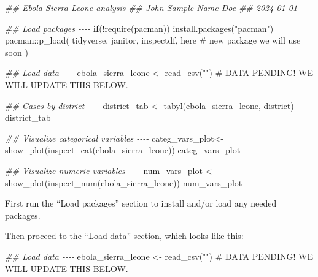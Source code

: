 \documentclass[
  letterpaper,
  DIV=11,
  numbers=noendperiod]{scrreprt}
\newenvironment{Shaded}{\begin{snugshade}}{\end{snugshade}}
\newcommand{\CommentTok}[1]{\textcolor[rgb]{0.37,0.37,0.37}{#1}}
\newcommand{\ControlFlowTok}[1]{\textcolor[rgb]{0.00,0.23,0.31}{\textbf{#1}}}
\newcommand{\DocumentationTok}[1]{\textcolor[rgb]{0.37,0.37,0.37}{\textit{#1}}}
\newcommand{\FunctionTok}[1]{\textcolor[rgb]{0.28,0.35,0.67}{#1}}
\newcommand{\NormalTok}[1]{\textcolor[rgb]{0.00,0.23,0.31}{#1}}
\newcommand{\OtherTok}[1]{\textcolor[rgb]{0.00,0.23,0.31}{#1}}
\newcommand{\SpecialCharTok}[1]{\textcolor[rgb]{0.37,0.37,0.37}{#1}}
\newcommand{\StringTok}[1]{\textcolor[rgb]{0.13,0.47,0.30}{#1}}
\begin{document}
\begin{Shaded}
\begin{Highlighting}[]
\DocumentationTok{\#\# Ebola Sierra Leone analysis}
\DocumentationTok{\#\# John Sample{-}Name Doe}
\DocumentationTok{\#\# 2024{-}01{-}01}


\DocumentationTok{\#\# Load packages {-}{-}{-}{-}}
\ControlFlowTok{if}\NormalTok{(}\SpecialCharTok{!}\FunctionTok{require}\NormalTok{(pacman)) }\FunctionTok{install.packages}\NormalTok{(}\StringTok{"pacman"}\NormalTok{)}
\NormalTok{pacman}\SpecialCharTok{::}\FunctionTok{p\_load}\NormalTok{(}
\NormalTok{  tidyverse,}
\NormalTok{  janitor,}
\NormalTok{  inspectdf,}
\NormalTok{  here }\CommentTok{\# new package we will use soon}
\NormalTok{)}


\DocumentationTok{\#\# Load data {-}{-}{-}{-}}
\NormalTok{ebola\_sierra\_leone }\OtherTok{\textless{}{-}} \FunctionTok{read\_csv}\NormalTok{(}\StringTok{""}\NormalTok{) }\CommentTok{\# DATA PENDING! WE WILL UPDATE THIS BELOW.}

\DocumentationTok{\#\# Cases by district {-}{-}{-}{-}}
\NormalTok{district\_tab }\OtherTok{\textless{}{-}} \FunctionTok{tabyl}\NormalTok{(ebola\_sierra\_leone, district)}
\NormalTok{district\_tab}

\DocumentationTok{\#\# Visualize categorical variables {-}{-}{-}{-}}
\NormalTok{categ\_vars\_plot}\OtherTok{\textless{}{-}} \FunctionTok{show\_plot}\NormalTok{(}\FunctionTok{inspect\_cat}\NormalTok{(ebola\_sierra\_leone))}
\NormalTok{categ\_vars\_plot}

\DocumentationTok{\#\# Visualize numeric variables {-}{-}{-}{-}}
\NormalTok{num\_vars\_plot }\OtherTok{\textless{}{-}} \FunctionTok{show\_plot}\NormalTok{(}\FunctionTok{inspect\_num}\NormalTok{(ebola\_sierra\_leone))}
\NormalTok{num\_vars\_plot}
\end{Highlighting}
\end{Shaded}

First run the ``Load packages'' section to install and/or load any
needed packages.

Then proceed to the ``Load data'' section, which looks like this:

\begin{Shaded}
\begin{Highlighting}[]
\DocumentationTok{\#\# Load data {-}{-}{-}{-}}
\NormalTok{ebola\_sierra\_leone }\OtherTok{\textless{}{-}} \FunctionTok{read\_csv}\NormalTok{(}\StringTok{""}\NormalTok{) }\CommentTok{\# DATA PENDING! WE WILL UPDATE THIS BELOW.}
\end{Highlighting}
\end{Shaded}
\end{document}
